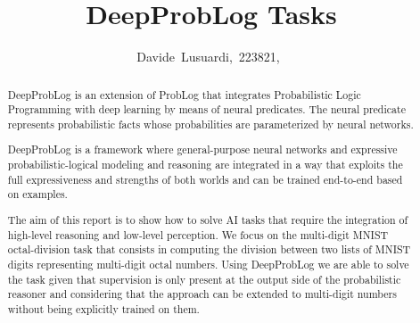 \documentclass[journal]{IEEEtran}
\begin{document}
%
\title{DeepProbLog Tasks}
%
%
%

\author{Davide~Lusuardi,~223821,~%
}


\maketitle

\begin{abstract}
  DeepProbLog is an extension of ProbLog that integrates Probabilistic Logic Programming with deep learning by means of neural predicates. The neural predicate represents probabilistic facts whose probabilities are parameterized by neural networks.

  DeepProbLog is a framework where general-purpose neural networks and expressive probabilistic-logical modeling and reasoning are integrated in a way that exploits the full expressiveness and strengths of both worlds and can be trained end-to-end based on examples.

  The aim of this report is to show how to solve AI tasks that require the integration of high-level reasoning and low-level perception. We focus on the multi-digit MNIST octal-division task that consists in computing the division between two lists of MNIST digits representing multi-digit octal numbers. Using DeepProbLog we are able to solve the task given that supervision is only present at the output side of the probabilistic reasoner and considering that the approach can be extended to multi-digit numbers without being explicitly trained on them.  
\end{abstract}
\end{document}
